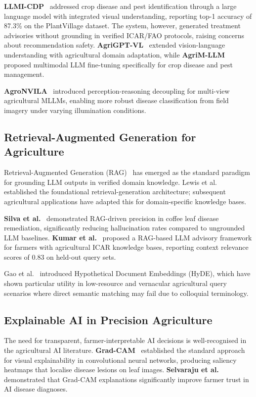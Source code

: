 \documentclass[12pt,a4paper]{article}
\begin{document}
\textbf{LLMI-CDP}~\cite{llmiCdp2025} addressed crop disease and pest identification through a large language model with integrated visual understanding, reporting top-1 accuracy of 87.3\% on the PlantVillage dataset. The system, however, generated treatment advisories without grounding in verified ICAR/FAO protocols, raising concerns about recommendation safety. \textbf{AgriGPT-VL}~\cite{agrigptvl2025} extended vision-language understanding with agricultural domain adaptation, while \textbf{AgriM-LLM}~\cite{agrimllm2026} proposed multimodal LLM fine-tuning specifically for crop disease and pest management.

\textbf{AgroNVILA}~\cite{agronvila2026} introduced perception-reasoning decoupling for multi-view agricultural MLLMs, enabling more robust disease classification from field imagery under varying illumination conditions.

\subsection{Retrieval-Augmented Generation for Agriculture}

Retrieval-Augmented Generation (RAG)~\cite{rag2020} has emerged as the standard paradigm for grounding LLM outputs in verified domain knowledge. Lewis et al.~\cite{rag2020} established the foundational retrieval-generation architecture; subsequent agricultural applications have adapted this for domain-specific knowledge bases.

\textbf{Silva et al.}~\cite{overcoming2024} demonstrated RAG-driven precision in coffee leaf disease remediation, significantly reducing hallucination rates compared to ungrounded LLM baselines. \textbf{Kumar et al.}~\cite{ragMaize2026} proposed a RAG-based LLM advisory framework for farmers with agricultural ICAR knowledge bases, reporting context relevance scores of 0.83 on held-out query sets.

Gao et al.~\cite{hyde2022} introduced Hypothetical Document Embeddings (HyDE), which have shown particular utility in low-resource and vernacular agricultural query scenarios where direct semantic matching may fail due to colloquial terminology.

\subsection{Explainable AI in Precision Agriculture}

The need for transparent, farmer-interpretable AI decisions is well-recognised in the agricultural AI literature. \textbf{Grad-CAM}~\cite{gradcam2017} established the standard approach for visual explainability in convolutional neural networks, producing saliency heatmaps that localise disease lesions on leaf images. \textbf{Selvaraju et al.}~\cite{gradcam2017} demonstrated that Grad-CAM explanations significantly improve farmer trust in AI disease diagnoses.
\end{document}
